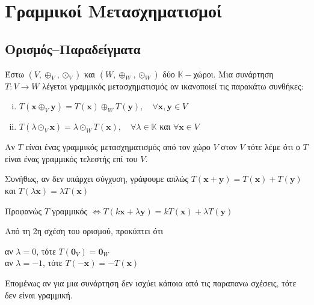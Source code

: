 




\pagestyle{vangelis}




\chapter{Γραμμικοί Μετασχηματισμοί}

\section{Ορισμός--Παραδείγματα}


\begin{dfn}
  Έστω $ (V, \oplus _{V}, \odot _{V}) $ και $ (W, \oplus _{W}, \odot _{W}) $ δύο 
  $ \mathbb{K} - $χώροι. Μια συνάρτηση $ T \colon V \to W $ λέγεται 
  \textcolor{Col1}{γραμμικός μετασχηματισμός} αν ικανοποιεί τις παρακάτω συνθήκες:
  \begin{enumerate}[(i)]
    \item $ T(\mathbf{x} \oplus _{V} \mathbf{y}) = T(\mathbf{x}) \oplus _{W}
      T(\mathbf{y}), \quad \forall \mathbf{x}, \mathbf{y}  \in V $
    \item $ T(\lambda \odot _{V} \mathbf{x}) = \lambda \odot _{W} T(\mathbf{x}), 
      \quad \forall \lambda \in \mathbb{K} $ και $ \forall \mathbf{x} \in V $
  \end{enumerate}
  Αν $T$ είναι ένας γραμμικός μετασχηματισμός από τον χώρο $V$ στον $V$ τότε λέμε 
  ότι ο $T$ είναι ένας \textcolor{Col1}{γραμμικός τελεστής} επί του $V$. 
\end{dfn}

\begin{rem}
\item {}
  \begin{myitemize}
    \item Συνήθως, αν δεν υπάρχει σύγχυση, γράφουμε απλώς 
          $ T(\mathbf{x}+ \mathbf{y}) = T(\mathbf{x}) + T(\mathbf{y}) $ και 
          $ T(\lambda \mathbf{x}) = \lambda T(\mathbf{x}) $
    \item Προφανώς $T$ γραμμικός $ \Leftrightarrow  T(k \mathbf{x} + \lambda 
      \mathbf{y}) =k T(\mathbf{x}) + \lambda T(\mathbf{y}) $
  \end{myitemize}
\end{rem}

\begin{rem}
    Από τη 2η σχέση του ορισμού, προκύπτει ότι
      \begin{center}
        αν $ \lambda = 0 $, τότε $ T(\mathbf{0}_{V}) = \mathbf{0}_{W} $ \\
        αν $ \lambda = -1 $, τότε $T(- \mathbf{x}) = - T(\mathbf{x}) $
      \end{center}
      Επομένως αν για μια συνάρτηση δεν ισχύει κάποια από τις παραπανω σχέσεις, τότε 
      δεν είναι γραμμική.
\end{rem}

